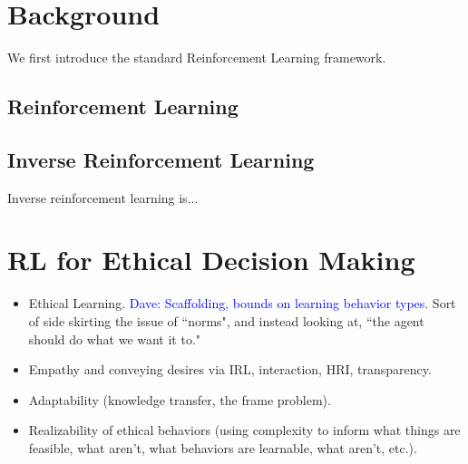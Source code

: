 \documentclass[11pt]{article}
\newcommand\davenote[1]{\textcolor{blue}{Dave: #1}}
\begin{document}
\section{Background}

We first introduce the standard Reinforcement Learning framework.


\subsection{Reinforcement Learning}

\subsection{Inverse Reinforcement Learning}

Inverse reinforcement learning is...


\section{RL for Ethical Decision Making}

\begin{itemize}
\item Ethical Learning. \davenote{Scaffolding, bounds on learning behavior types}. Sort of side skirting the issue of ``norms", and instead looking at, ``the agent should do what we want it to."
\item Empathy and conveying desires via IRL, interaction, HRI, transparency.
\item Adaptability (knowledge transfer, the frame problem).
\item Realizability of ethical behaviors (using complexity to inform what things are feasible, what aren't, what behaviors are learnable, what aren't, etc.).
\end{itemize}
\end{document}
